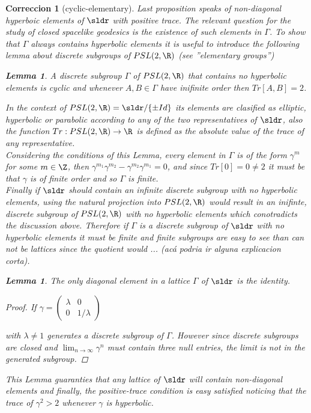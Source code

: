 \documentclass[11pt]{amsart}
\newtheorem{correccion}{Correccion}
\theoremstyle{plain}
\newtheorem{lem}[thm]{Lemma}
\theoremstyle{definition}
\theoremstyle{remark}
\begin{document}
\begin{correccion}[cyclic-elementary] 
Last proposition speaks of non-diagonal hyperboic elements of $\sldr$ with positive trace. The relevant question for the study of closed spacelike geodesics is the existence of such elements in $\Gamma$. To show that $\Gamma$ always contains hyperbolic elements it is useful to introduce the following lemma about discrete subgroups of $PSL(2, \R)$ (see \cite{CITA} ''elementary groups'')
\begin{lem}
A discrete subgroup $\Gamma$ of $PSL(2,\R)$ that contains no hyperbolic elements is cyclic and whenever $A,B \in \Gamma$ have inifinite order then $Tr[A,B] = 2$.
\end{lem}
In the context of $PSL(2, \R)=\sldr / \{ \pm Id \}$ its elements are clasified as elliptic, hyperbolic or  parabolic according to any of the two representatives of $\sldr$, also the function $Tr: PSL(2, \R) \rightarrow \R$ is defined as the absolute value of the trace of any representative.\\

Considering the conditions of this Lemma, every element in $\Gamma$ is of the form $\gamma^m$ for some $m \in \Z$, then $\gamma^{m_1} \gamma^{m_2 }- \gamma^{m_2} \gamma^{m_1} = 0$, and since $Tr[0] = 0 \neq 2$ it must be that $\gamma$ is of finite order and so $\Gamma$ is finite.\\

Finally if $\sldr$ should contain an infinite discrete subgroup with no hyperbolic elements, using the natural projection into $PSL(2, \R)$ would result in an inifinte, discrete subgroup of $PSL(2, \R)$ with no hyperbolic elements which conotradicts the discussion above. Therefore if $\Gamma$ is a discrete subgroup of $\sldr$ with no hyperbolic elements it must be finite and finite subgroups are easy to see than can not be lattices since the quotient would ... (acá podria ir alguna explicacion corta).\\
 


\begin{lem}
The only diagonal element in a lattice $\Gamma$ of $\sldr$ is the identity.
\end{lem}

\begin{proof}
If $\gamma = \left(\begin{array}{cc}
\lambda & 0 \\
0 & 1/\lambda \end{array}\right)$

with $\lambda \neq 1$ generates a discrete subgroup of $\Gamma$. However since discrete subgroups are closed \cite{INCLUDE1} and $ \lim_{n \to \infty} \gamma^n $ must contain three null entries, the limit is not in the generated subgroup.

\end{proof}

This Lemma guaranties that any lattice of $\sldr$ will contain non-diagonal elements and finally, the \textit{positive-trace} condition is easy satisfied noticing that the trace of $\gamma^2 > 2$ whenever $\gamma$ is hyperbolic.

\end{correccion}
\end{document}
